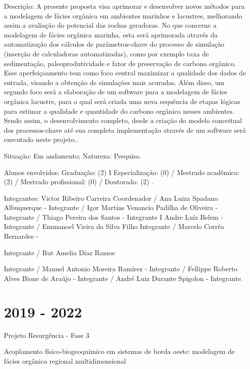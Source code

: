 \documentclass[10pt]{article}
\begin{document}
Descrição: A presente proposta visa aprimorar e desenvolver novos métodos para a modelagem de fácies orgânica em ambientes marinhos e lacustres, melhorando assim a avaliação do potencial das rochas geradoras. No que concerne a modelagem de fácies orgânica marinha, esta será aprimorada através da automatização dos cálculos de parâmetros-chave do processo de simulação (inserção de calculadoras automatizadas), como por exemplo taxa de sedimentação, paleoprodutividade e fator de preservação de carbono orgânico. Esse aperfeiçoamento tem como foco central maximizar a qualidade dos dados de entrada, visando a obtenção de simulações mais acuradas. Além disso, um segundo foco será a elaboração de um software para a modelagem de fácies orgânica lacustre, para o qual será criada uma nova sequência de etapas lógicas para estimar a qualidade e quantidade do carbono orgânico nesses ambientes. Sendo assim, o desenvolvimento completo, desde a criação do modelo conceitual dos processos-chave até sua completa implementação através de um software será executado neste projeto..

Situação: Em andamento; Natureza: Pesquisa.

Alunos envolvidos: Graduação: (2) I Especialização: (0) / Mestrado acadêmico: (2) / Mestrado profissional: (0) / Doutorado: (2) .

Integrantes: Victor Ribeiro Carreira Coordenador / Ana Luiza Spadano Albuquerque - Integrante / Igor Martins Venancio Padilha de Oliveira - Integrante / Thiago Pereira dos Santos - Integrante I Andre Luiz Belem - Integrante / Emmanoel Vieira da Silva Filho Integrante / Marcelo Corrêa Bernardes -

Integrante / Rut Amelia Díaz Ramos

Integrante / Manuel Antonio Moreira Ramírez - Integrante / Fellippe Roberto Alves Bione de Araújo - Integrante / André Luiz Durante Spigolon - Integrante.

\section*{2019 - 2022}
Projeto Resurgência - Fase 3

Acoplamento físico-biogeoquímico em sistemas de borda oeste: modelagem de fácies orgânica regional multidimensional
\end{document}
